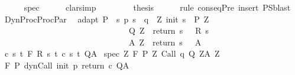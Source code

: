 \begin{isabellebody}
\ \ \ \ \isamarkupfalse%
\ spec\isanewline
\ \ \ \ \isamarkupfalse%
\ clarsimp\isanewline
\ \ \ \ \isamarkupfalse%
\isanewline
\ \ \isamarkupfalse%
\ {\isacharquery}thesis\isanewline
\ \ \ \ \isamarkupfalse%
\ {\isacharparenleft}rule\ conseqPre{\isacharparenright}\ {\isacharparenleft}insert\ P{\isacharunderscore}S{\isacharcomma}blast{\isacharparenright}\isanewline
{}\isamarkupfalse%
%
\endisatagproof
{\isafoldproof}%
%
\isadelimproof
\isanewline
%
\endisadelimproof
\isanewline
\isanewline
{}\isamarkupfalse%
\ DynProcProcPar{\isacharcolon}\ \isanewline
{}\ adapt{\isacharcolon}\ {\isachardoublequoteopen}P\ {\isasymsubseteq}\ {\isacharbraceleft}s{\isachardot}\ p\ s\ {\isacharequal}\ q\ {\isasymand}\ {\isacharparenleft}{\isasymexists}Z{\isachardot}\ init\ s\ {\isasymin}\ P{\isacharprime}\ Z\ \ {\isasymand}\ \isanewline
\ \ \ \ \ \ \ \ \ \ \ \ \ \ \ \ \ \ \ \ \ \ \ \ \ \ \ \ {\isacharparenleft}{\isasymforall}{\isasymtau}{\isachardot}\ {\isasymtau}\ {\isasymin}\ Q{\isacharprime}\ Z\ {\isasymlongrightarrow}\ return\ s\ {\isasymtau}\ {\isasymin}\ R\ s\ {\isasymtau}{\isacharparenright}\ {\isasymand}\isanewline
\ \ \ \ \ \ \ \ \ \ \ \ \ \ \ \ \ \ \ \ \ \ \ \ \ \ \ \ {\isacharparenleft}{\isasymforall}{\isasymtau}{\isachardot}\ {\isasymtau}\ {\isasymin}\ A{\isacharprime}\ Z\ {\isasymlongrightarrow}\ return\ s\ {\isasymtau}\ {\isasymin}\ A{\isacharparenright}{\isacharparenright}{\isacharbraceright}{\isachardoublequoteclose}\isanewline
{}\ c{\isacharcolon}\ {\isachardoublequoteopen}{\isasymforall}s\ t{\isachardot}\ {\isasymGamma}{\isacharcomma}{\isasymTheta}{\isasymturnstile}\isactrlbsub {\isacharslash}F\isactrlesub \ {\isacharparenleft}R\ s\ t{\isacharparenright}\ {\isacharparenleft}c\ s\ t{\isacharparenright}\ Q{\isacharcomma}A{\isachardoublequoteclose}\isanewline
{}\ spec{\isacharcolon}\ {\isachardoublequoteopen}{\isasymforall}Z{\isachardot}\ {\isasymGamma}{\isacharcomma}{\isasymTheta}{\isasymturnstile}\isactrlbsub {\isacharslash}F\isactrlesub \ {\isacharparenleft}P{\isacharprime}\ Z{\isacharparenright}\ Call\ q\ {\isacharparenleft}Q{\isacharprime}\ Z{\isacharparenright}{\isacharcomma}{\isacharparenleft}A{\isacharprime}\ Z{\isacharparenright}{\isachardoublequoteclose}\isanewline
{}\ {\isachardoublequoteopen}{\isasymGamma}{\isacharcomma}{\isasymTheta}{\isasymturnstile}\isactrlbsub {\isacharslash}F\isactrlesub \ P\ {\isacharparenleft}dynCall\ init\ p\ return\ c{\isacharparenright}\ Q{\isacharcomma}A{\isachardoublequoteclose}\isanewline

\end{isabellebody}
